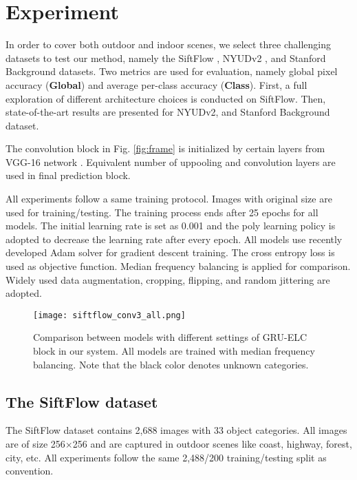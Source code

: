 \documentclass[10pt,twocolumn,letterpaper]{article}
\begin{document}
\section{Experiment}
In order to cover both outdoor and indoor scenes, we select three challenging datasets to test our method, namely the SiftFlow \cite{47}, NYUDv2 \cite{46}, and Stanford Background \cite{48} datasets. Two metrics are used for evaluation, namely global pixel accuracy (\textbf{Global}) and average per-class accuracy (\textbf{Class}). First, a full exploration of different architecture choices is conducted on SiftFlow. Then, state-of-the-art results are presented for NYUDv2, and Stanford Background dataset. 

The convolution block in Fig. \ref{fig:frame} is initialized by certain layers from VGG-16 network \cite{vgg}. Equivalent number of uppooling and convolution layers are used in final prediction block.

All experiments follow a same training protocol. Images with original size are used for training/testing. The training process ends after 25 epochs for all models. The initial learning rate is set as 0.001 and the poly learning policy is adopted to decrease the learning rate after every epoch. All models use recently developed Adam solver \cite{adam} for gradient descent training. The cross entropy loss is used as objective function. Median frequency balancing \cite{2} is applied for comparison. Widely used data augmentation, cropping, flipping, and random jittering are adopted. %


\begin{figure}
\begin{center}
   \texttt{[image: siftflow\_conv3\_all.png]}
\end{center}
   \caption{Comparison between models with different settings of GRU-ELC block in our system. All models are trained with median frequency balancing. Note that the black color denotes unknown categories.}
\label{fig:siftflow_conv3_all}
\end{figure}



\subsection{The SiftFlow dataset}
The SiftFlow dataset contains 2,688 images with 33 object categories. All images are of size 256$\times$256 and are captured in outdoor scenes like coast, highway, forest, city, etc. All experiments follow the same 2,488/200 training/testing split as convention.
\end{document}
